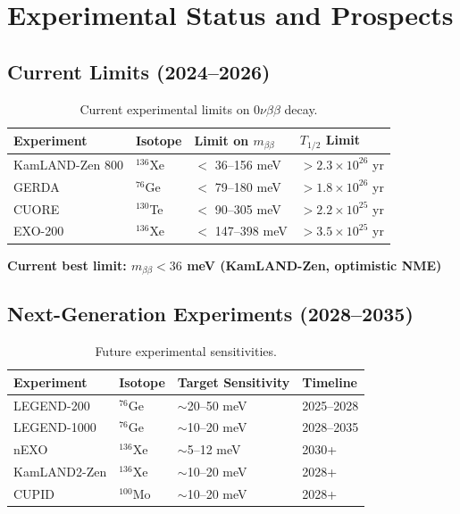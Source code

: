\documentclass[12pt,a4paper]{article}
\begin{document}
\section{Experimental Status and Prospects}

\subsection{Current Limits (2024--2026)}

\begin{table}[h]
\centering
\begin{tabular}{@{}llll@{}}
\toprule
Experiment & Isotope & Limit on $m_{\beta\beta}$ & $T_{1/2}$ Limit \\
\midrule
KamLAND-Zen 800 & $^{136}$Xe & $<$ 36--156 meV & $> 2.3 \times 10^{26}$ yr \\
GERDA & $^{76}$Ge & $<$ 79--180 meV & $> 1.8 \times 10^{26}$ yr \\
CUORE & $^{130}$Te & $<$ 90--305 meV & $> 2.2 \times 10^{25}$ yr \\
EXO-200 & $^{136}$Xe & $<$ 147--398 meV & $> 3.5 \times 10^{25}$ yr \\
\bottomrule
\end{tabular}
\caption{Current experimental limits on $0\nu\beta\beta$ decay.}
\end{table}

\textbf{Current best limit: $m_{\beta\beta} < 36$ meV (KamLAND-Zen, optimistic NME)}

\subsection{Next-Generation Experiments (2028--2035)}

\begin{table}[h]
\centering
\begin{tabular}{@{}llll@{}}
\toprule
Experiment & Isotope & Target Sensitivity & Timeline \\
\midrule
LEGEND-200 & $^{76}$Ge & $\sim$20--50 meV & 2025--2028 \\
LEGEND-1000 & $^{76}$Ge & $\sim$10--20 meV & 2028--2035 \\
nEXO & $^{136}$Xe & $\sim$5--12 meV & 2030+ \\
KamLAND2-Zen & $^{136}$Xe & $\sim$10--20 meV & 2028+ \\
CUPID & $^{100}$Mo & $\sim$10--20 meV & 2028+ \\
\bottomrule
\end{tabular}
\caption{Future experimental sensitivities.}
\end{table}
\end{document}
